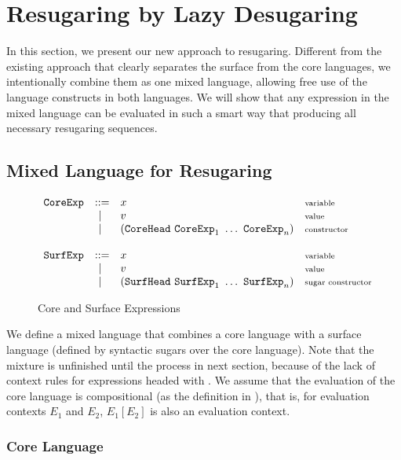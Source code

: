 
\section{Resugaring by Lazy Desugaring}
\label{sec3}

In this section, we present our new approach to resugaring. Different from the existing approach that clearly separates the surface from the core languages, we intentionally combine them as one mixed language, allowing free use of the language constructs in both languages. We will show that any expression in the mixed language can be evaluated in such a smart way that producing all necessary resugaring sequences.

\subsection{Mixed Language for Resugaring}

\begin{figure}[t]
\begin{flushleft}
{\footnotesize
\[
\begin{array}{lllll}
\mbox{\tt CoreExp} &::=& x  & \mbox{{\scriptsize variable}}\\
&~|~& v  & \mbox{{\scriptsize value}}\\
&~|~& (\mbox{\tt CoreHead}~\mbox{\tt CoreExp}_1~\ldots~\mbox{\tt CoreExp}_n) & \mbox{{\scriptsize constructor}}\\
\\
\mbox{\tt SurfExp} &::=& x  & \mbox{{\scriptsize variable}}\\
&~|~& v  & \mbox{{\scriptsize value}}\\
&~|~& (\mbox{\tt SurfHead}~\mbox{\tt SurfExp}_1~\ldots~\mbox{\tt SurfExp}_n) & \mbox{{\scriptsize sugar constructor}}\\
\end{array}
\]
}
\end{flushleft}


	\caption{Core and Surface Expressions}
	\label{fig:expression}
\end{figure}

We define a mixed language that combines a core language with a surface language (defined by syntactic sugars over the core language). Note that the mixture is unfinished until the process in next section, because of the lack of context rules for expressions headed with . We assume that the evaluation of the core language is  compositional (as the definition in \cite{hygienic}), that is, for evaluation contexts $E_1$ and $E_2$, $E_1[E_2]$ is also an evaluation context.
\subsubsection{Core Language}


